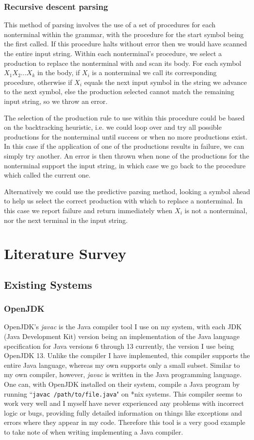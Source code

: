 \documentclass[a4paper, 11pt]{article}
\begin{document}
\subsubsection{Recursive descent parsing}
This method of parsing involves the use of a set of procedures for each nonterminal within the grammar, with the procedure for the start symbol being the first called. If this procedure halts without error then we would have scanned the entire input string. Within each nonterminal's procedure, we select a production to replace the nonterminal with and scan its body. For each symbol $X_1X_2...X_k$ in the body, if $X_i$ is a nonterminal we call its corresponding procedure, otherwise if $X_i$ equals the next input symbol in the string we advance to the next symbol, else the production selected cannot match the remaining input string, so we throw an error.

The selection of the production rule to use within this procedure could be based on the backtracking heuristic, i.e. we could loop over and try all possible productions for the nonterminal until success or when no more productions exist. In this case if the application of one of the productions results in failure, we can simply try another. An error is then thrown when none of the productions for the nonterminal support the input string, in which case we go back to the procedure which called the current one.

Alternatively we could use the predictive parsing method, looking a symbol ahead to help us select the correct production with which to replace a nonterminal. In this case we report failure and return immediately when $X_i$ is not a nonterminal, nor the next terminal in the input string.

\newpage\section{Literature Survey}
\subsection{Existing Systems}

\subsubsection{OpenJDK\cite{OpenJDK}}
OpenJDK's \textit{javac} is the Java compiler tool I use on my system, with each JDK (Java Development Kit) version being an implementation of the Java language specification for Java versions 6 through 13 currently, the version I use being OpenJDK 13. Unlike the compiler I have implemented, this compiler supports the entire Java language, whereas my own supports only a small subset. Similar to my own compiler, however, \textit{javac} is written in the Java programming language. One can, with OpenJDK installed on their system, compile a Java program by running ``\texttt{javac /path/to/file.java}" on *nix systems. This compiler seems to work very well and I myself have never experienced any problems with incorrect logic or bugs, providing fully detailed information on things like exceptions and errors where they appear in my code. Therefore this tool is a very good example to take note of when writing implementing a Java compiler.
\end{document}
